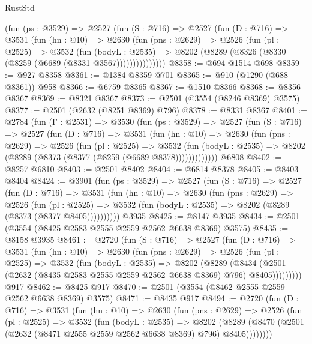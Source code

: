 \begin{lexlean}{RustStd}
\begin{coremodule}
{\begin{coremodule}
{{{{{{{{{{{{{{{{{{{{        (fun (ps : @3529) =>
        @2527
          (fun (S : @716) =>
          @2527
            (fun (D : @716) =>
            @3531
              (fun (hn : @10) =>
              @2630
                (fun (pns : @2629) =>
                @2526
                  (fun (pl : @2525) =>
                  @3532
                    (fun (bodyL : @2535) =>
                    @8202 (@8289 (@8326 (@8330 (@8259 (@6689 (@8331 @3567)))))))))))))))
@8358 := @694 @1514 @698
@8359 := @927 @8358
@8361 := @1384 @8359 @701
@8365 := @910 (@1290 (@688 @8361)) @958
@8366 := @6759 @8365
@8367 := @1510 @8366
@8368 := @8356 @8367
@8369 := @8321 @8367
@8373 := @2501 (@3554 (@8246 @8369) @3575)
@8377 := @2501 (@2632 (@8251 @8369) @796)
@8378 := @8331 @8367
@8401 := @2784
    (fun (Γ : @2531) =>
    @3530
      (fun (ps : @3529) =>
      @2527
        (fun (S : @716) =>
        @2527
          (fun (D : @716) =>
          @3531
            (fun (hn : @10) =>
            @2630
              (fun (pns : @2629) =>
              @2526
                (fun (pl : @2525) =>
                @3532
                  (fun (bodyL : @2535) =>
                  @8202 (@8289 (@8373 (@8377 (@8259 (@6689 @8378)))))))))))))
    @6808
@8402 := @8257 @6810
@8403 := @2501 @8402
@8404 := @6814 @8378
@8405 := @8403 @8404
@8424 := @3901
    (fun (ps : @3529) =>
    @2527
      (fun (S : @716) =>
      @2527
        (fun (D : @716) =>
        @3531
          (fun (hn : @10) =>
          @2630
            (fun (pns : @2629) =>
            @2526
              (fun (pl : @2525) =>
              @3532 (fun (bodyL : @2535) => @8202 (@8289 (@8373 (@8377 @8405))))))))))
    @3935
@8425 := @8147 @3935
@8434 := @2501 (@3554 (@8425 @2583 @2555 @2559 @2562 @6638 @8369) @3575)
@8435 := @8158 @3935
@8461 := @2720
    (fun (S : @716) =>
    @2527
      (fun (D : @716) =>
      @3531
        (fun (hn : @10) =>
        @2630
          (fun (pns : @2629) =>
          @2526
            (fun (pl : @2525) =>
            @3532
              (fun (bodyL : @2535) =>
              @8202
                (@8289
                  (@8434
                    (@2501 (@2632 (@8435 @2583 @2555 @2559 @2562 @6638 @8369) @796) @8405)))))))))
    @917
@8462 := @8425 @917
@8470 := @2501 (@3554 (@8462 @2555 @2559 @2562 @6638 @8369) @3575)
@8471 := @8435 @917
@8494 := @2720
    (fun (D : @716) =>
    @3531
      (fun (hn : @10) =>
      @2630
        (fun (pns : @2629) =>
        @2526
          (fun (pl : @2525) =>
          @3532
            (fun (bodyL : @2535) =>
            @8202
              (@8289 (@8470 (@2501 (@2632 (@8471 @2555 @2559 @2562 @6638 @8369) @796) @8405))))))))
}}}}}}}}}}}}}}}}}}}}
\end{coremodule}}
\end{coremodule}
\end{lexlean}
